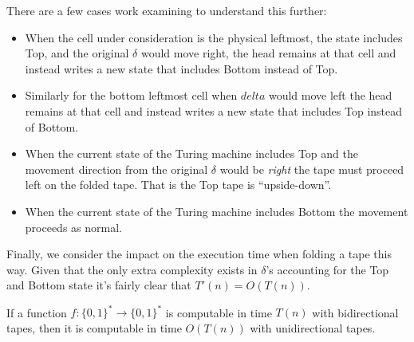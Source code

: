 \documentclass[usletter]{article}
\begin{document}
There are a few cases work examining to understand this further:

\begin{itemize}
  \item When the cell under consideration is the physical leftmost, the state includes Top, and the original $\delta$ would move right, the head remains at that cell and instead writes a new state that includes Bottom instead of Top.
  \item Similarly for the bottom leftmost cell when $delta$ would move left the head remains at  that cell and instead writes a new state that includes Top instead of Bottom.
  \item When the current state of the Turing machine includes Top and the movement direction from the original $\delta$ would be \textit{right} the tape must proceed left on the folded tape. That is the Top tape is ``upside-down''.
  \item When the current state of the Turing machine includes Bottom the movement proceeds as normal.
\end{itemize}

\newpage

Finally, we consider the impact on the execution time when folding a tape this way. Given that the only extra complexity exists in $\delta$'s accounting for the Top and Bottom state it's fairly clear that $T'(n) = O(T(n))$.

\begin{theorem}
  If a function $f:\{0,1\}^* \rightarrow \{0,1\}^*$ is computable in time $T(n)$ with bidirectional tapes, then it is computable in time $O(T(n))$ with unidirectional tapes.
\end{theorem}
\end{document}
